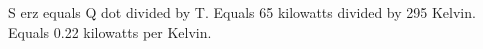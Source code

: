 S erz equals Q dot divided by T.  
Equals 65 kilowatts divided by 295 Kelvin.  
Equals 0.22 kilowatts per Kelvin.